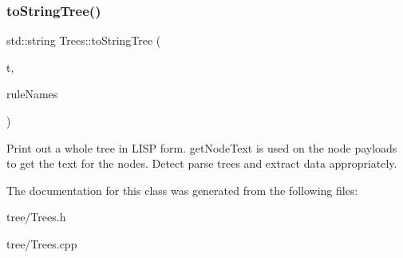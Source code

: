 \subsubsection{\texorpdfstring{to\+String\+Tree()}{toStringTree()}\hspace{0.1cm}{\footnotesize\ttfamily [3/3]}}
{\footnotesize\ttfamily std\+::string Trees\+::to\+String\+Tree (\begin{DoxyParamCaption}\item[{\hyperlink{classantlr4_1_1tree_1_1ParseTree}{Parse\+Tree} $\ast$}]{t,  }\item[{const std\+::vector$<$ std\+::string $>$ \&}]{rule\+Names }\end{DoxyParamCaption})\hspace{0.3cm}{\ttfamily [static]}}

Print out a whole tree in L\+I\+SP form. get\+Node\+Text is used on the node payloads to get the text for the nodes. Detect parse trees and extract data appropriately. 

The documentation for this class was generated from the following files\+:\begin{DoxyCompactItemize}
\item 
tree/Trees.\+h\item 
tree/Trees.\+cpp\end{DoxyCompactItemize}
